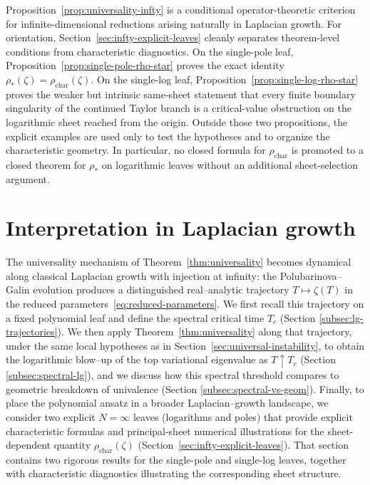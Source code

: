 \documentclass[11pt]{amsart}
\numberwithin{equation}{section}
\theoremstyle{plain}
\theoremstyle{definition}
\theoremstyle{remark}
\begin{document}
Proposition~\ref{prop:universality-infty} is a conditional
operator-theoretic criterion for infinite-dimensional reductions arising
naturally in Laplacian growth. For orientation,
Section~\ref{sec:infty-explicit-leaves} cleanly separates theorem-level conditions
from characteristic diagnostics. On the single-pole leaf,
Proposition~\ref{prop:single-pole-rho-star} proves the exact identity
\(\rho_*(\zeta)=\rho_{\mathrm{char}}(\zeta)\). On the single-log leaf,
Proposition~\ref{prop:single-log-rho-star} proves the weaker but intrinsic
same-sheet statement that every finite boundary singularity of the continued
Taylor branch is a critical-value obstruction on the logarithmic sheet reached
from the origin. Outside those two propositions, the explicit examples are used
only to test the hypotheses and to organize the characteristic geometry. In
particular, no closed formula for \(\rho_{\mathrm{char}}\) is promoted to a
closed theorem for \(\rho_*\) on logarithmic leaves without an additional
sheet-selection argument.



\section{Interpretation in Laplacian growth}
\label{sec:laplacian-growth}


The universality mechanism of Theorem~\ref{thm:universality} becomes dynamical
along classical Laplacian growth with injection at infinity: the
Polubarinova--Galin evolution produces a distinguished real--analytic
trajectory $T\mapsto \zeta(T)$ in the reduced parameters~\eqref{eq:reduced-parameters}.
We first recall this trajectory on a fixed polynomial leaf and define the
spectral critical time $T_c$ (Section \ref{subsec:lg-trajectories}). We then apply
Theorem~\ref{thm:universality} along that trajectory, under the same local
hypotheses as in Section~\ref{sec:universal-instability}, to obtain the
logarithmic blow--up of the top variational eigenvalue as $T\uparrow T_c$
(Section \ref{subsec:spectral-lg}), and we discuss how this spectral threshold
compares to geometric breakdown of univalence (Section \ref{subsec:spectral-vs-geom}). Finally, to place the polynomial
ansatz in a broader Laplacian--growth landscape, we consider two explicit
$N=\infty$ leaves (logarithms and poles) that provide explicit characteristic
formulas and principal-sheet numerical illustrations for the sheet-dependent
quantity \(\rho_{\mathrm{char}}(\zeta)\) (Section~\ref{sec:infty-explicit-leaves}).
That section contains two rigorous results for the single-pole and single-log
leaves, together with characteristic diagnostics illustrating the corresponding
sheet structure.
\end{document}
